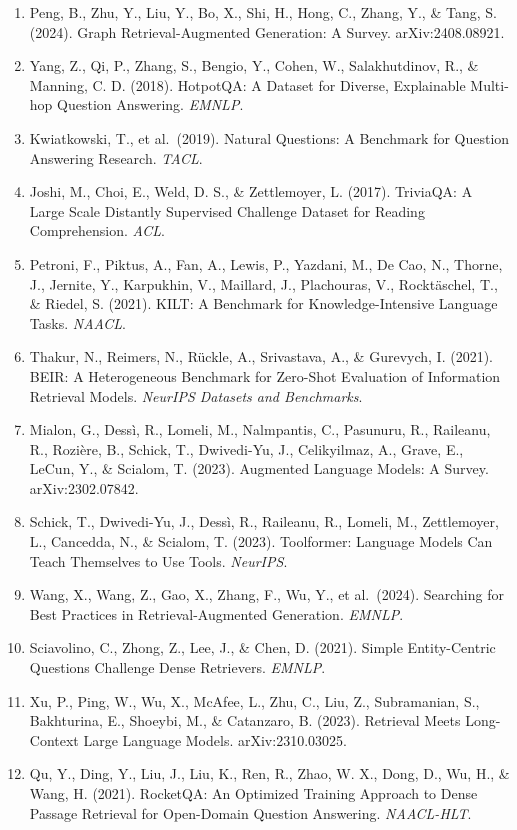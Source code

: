 \begin{enumerate}
\item
  Peng, B., Zhu, Y., Liu, Y., Bo, X., Shi, H., Hong, C., Zhang, Y., \& Tang, S. (2024). Graph Retrieval-Augmented Generation: A Survey. arXiv:2408.08921.
\item
  Yang, Z., Qi, P., Zhang, S., Bengio, Y., Cohen, W., Salakhutdinov, R., \& Manning, C. D. (2018). HotpotQA: A Dataset for Diverse, Explainable Multi-hop Question Answering. \emph{EMNLP}.
\item
  Kwiatkowski, T., et al.~(2019). Natural Questions: A Benchmark for Question Answering Research. \emph{TACL}.
\item
  Joshi, M., Choi, E., Weld, D. S., \& Zettlemoyer, L. (2017). TriviaQA: A Large Scale Distantly Supervised Challenge Dataset for Reading Comprehension. \emph{ACL}.
\item
  Petroni, F., Piktus, A., Fan, A., Lewis, P., Yazdani, M., De Cao, N., Thorne, J., Jernite, Y., Karpukhin, V., Maillard, J., Plachouras, V., Rocktäschel, T., \& Riedel, S. (2021). KILT: A Benchmark for Knowledge-Intensive Language Tasks. \emph{NAACL}.
\item
  Thakur, N., Reimers, N., Rückle, A., Srivastava, A., \& Gurevych, I. (2021). BEIR: A Heterogeneous Benchmark for Zero-Shot Evaluation of Information Retrieval Models. \emph{NeurIPS Datasets and Benchmarks}.
\item
  Mialon, G., Dessì, R., Lomeli, M., Nalmpantis, C., Pasunuru, R., Raileanu, R., Rozière, B., Schick, T., Dwivedi-Yu, J., Celikyilmaz, A., Grave, E., LeCun, Y., \& Scialom, T. (2023). Augmented Language Models: A Survey. arXiv:2302.07842.
\item
  Schick, T., Dwivedi-Yu, J., Dessì, R., Raileanu, R., Lomeli, M., Zettlemoyer, L., Cancedda, N., \& Scialom, T. (2023). Toolformer: Language Models Can Teach Themselves to Use Tools. \emph{NeurIPS}.
\item
  Wang, X., Wang, Z., Gao, X., Zhang, F., Wu, Y., et al.~(2024). Searching for Best Practices in Retrieval-Augmented Generation. \emph{EMNLP}.
\item
  Sciavolino, C., Zhong, Z., Lee, J., \& Chen, D. (2021). Simple Entity-Centric Questions Challenge Dense Retrievers. \emph{EMNLP}.
\item
  Xu, P., Ping, W., Wu, X., McAfee, L., Zhu, C., Liu, Z., Subramanian, S., Bakhturina, E., Shoeybi, M., \& Catanzaro, B. (2023). Retrieval Meets Long-Context Large Language Models. arXiv:2310.03025.
\item
  Qu, Y., Ding, Y., Liu, J., Liu, K., Ren, R., Zhao, W. X., Dong, D., Wu, H., \& Wang, H. (2021). RocketQA: An Optimized Training Approach to Dense Passage Retrieval for Open-Domain Question Answering. \emph{NAACL-HLT}.

\end{enumerate}
